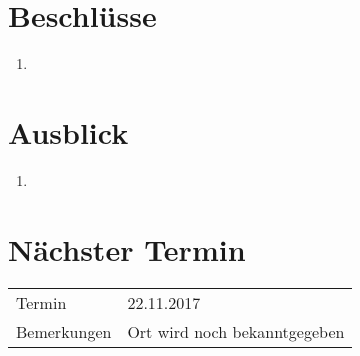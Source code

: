 \documentclass[11pt, a4paper,oneside]{scrartcl}
\begin{document}
\section{Beschlüsse}
\begin{enumerate}
	\item %
\end{enumerate} 

\section{Ausblick}
\begin{enumerate}
 	\item 
\end{enumerate}

\section{Nächster Termin}
\begin{tabu} to \linewidth {l X }
	\toprule
	Termin & 22.11.2017  \\
	Bemerkungen & Ort wird noch bekanntgegeben   \\
	\bottomrule
\end{tabu}
\end{document}
